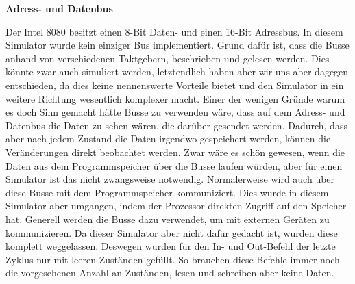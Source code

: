 \documentclass[12pt]{article}
\begin{document}
\noindent
\textbf{Adress- und Datenbus}

\noindent
Der Intel 8080 besitzt einen 8-Bit Daten- und einen 16-Bit Adressbus. 
In diesem Simulator wurde kein einziger Bus implementiert. Grund dafür ist, dass die Busse anhand von verschiedenen Taktgebern, beschrieben und gelesen werden. Dies könnte zwar auch simuliert werden, letztendlich haben aber wir uns aber dagegen entschieden, da dies keine nennenswerte Vorteile bietet und den Simulator in ein weitere Richtung wesentlich komplexer macht. Einer der wenigen Gründe warum es doch Sinn gemacht hätte Busse zu verwenden wäre, dass auf dem Adress- und Datenbus die Daten zu sehen wären, die darüber gesendet werden. Dadurch, dass aber nach jedem Zustand die Daten irgendwo gespeichert werden, können die Veränderungen direkt beobachtet werden. Zwar wäre es schön gewesen, wenn die Daten aus dem Programmspeicher über die Busse laufen würden, aber für einen Simulator ist das nicht zwangsweise notwendig. Normalerweise wird auch über diese Busse mit dem Programmspeicher kommuniziert. Dies wurde in diesem Simulator aber umgangen, indem der Prozessor direkten Zugriff auf den Speicher hat. Generell werden die Busse dazu verwendet, um mit externen Geräten zu kommunizieren. Da dieser Simulator aber nicht dafür gedacht ist, wurden diese komplett weggelassen. Deswegen wurden für den In- und Out-Befehl der letzte Zyklus nur mit leeren Zuständen gefüllt. So brauchen diese Befehle immer noch die vorgesehenen Anzahl an Zuständen, lesen und schreiben aber keine Daten.
\\
\end{document}
